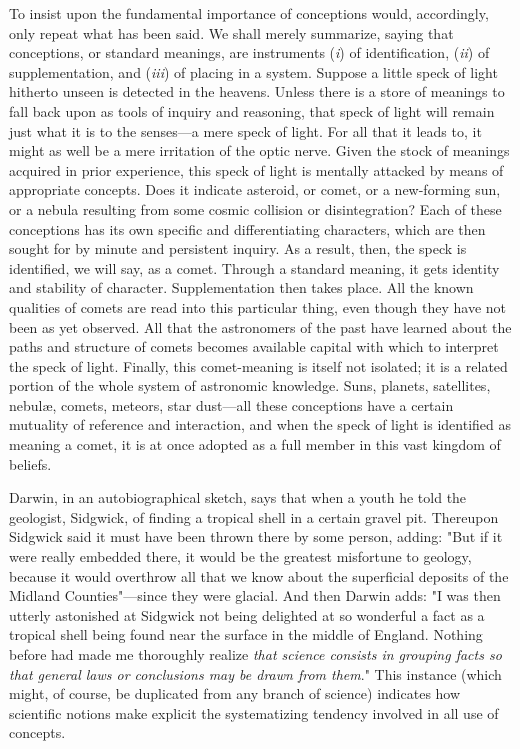 \documentclass[showtrims,ustradepaper]{memoir}
\begin{document}
To insist upon the fundamental importance of conceptions would,
accordingly, only repeat what has been said. We shall merely summarize,
saying that conceptions, or standard meanings, are instruments
(\emph{i}) of identification, (\emph{ii}) of supplementation, and
(\emph{iii}) of placing in a system. Suppose a little speck of light
hitherto unseen is detected in the heavens. Unless there is a store of
meanings to fall back upon as tools of inquiry and reasoning, that speck
of light will remain just what it is to the senses---a mere speck of
light. For all that it leads to, it might as well be a mere irritation
of the optic nerve. Given the stock of meanings acquired in prior
experience, this speck of light is mentally attacked by means of
appropriate concepts. Does it indicate asteroid, or comet, or a
new-forming sun, or a nebula resulting from some cosmic collision or
disintegration? Each of these conceptions has its own specific and
differentiating characters, which are then sought for by minute and
persistent inquiry. As a result, then, the speck is identified, we will
say, as a comet. Through a standard meaning, it gets identity and
stability of character. Supplementation then takes place. All the known
qualities of comets are read into this particular thing, even though
they have not been as yet observed. All that the astronomers of the past
have learned about the paths and structure of comets becomes available
capital with which to interpret the
speck
of light. Finally, this comet-meaning is itself not isolated; it is a
related portion of the whole system of astronomic knowledge. Suns,
planets, satellites, nebulæ, comets, meteors, star dust---all these
conceptions have a certain mutuality of reference and interaction, and
when the speck of light is identified as meaning a comet, it is at once
adopted as a full member in this vast kingdom of beliefs.


Darwin, in an autobiographical sketch, says that when a youth he told
the geologist, Sidgwick, of finding a tropical shell in a certain gravel
pit. Thereupon Sidgwick said it must have been thrown there by some
person, adding: "But if it were really embedded there, it would be the
greatest misfortune to geology, because it would overthrow all that we
know about the superficial deposits of the Midland Counties"---since
they were glacial. And then Darwin adds: "I was then utterly astonished
at Sidgwick not being delighted at so wonderful a fact as a tropical
shell being found near the surface in the middle of England. Nothing
before had made me thoroughly realize \emph{that science consists in
grouping facts so that general laws or conclusions may be drawn from
them}." This instance (which might, of course, be duplicated from any
branch of science) indicates how scientific notions make explicit the
systematizing tendency involved in all use of concepts.
\end{document}
